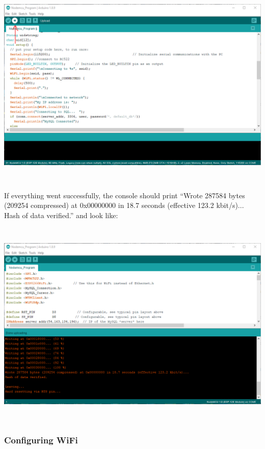 \documentclass[12pt]{article}
\begin{document}
\begin{spacing}{1.2}
\begin{center}
\includegraphics[height=10cm]{Arduino Program 4.PNG}
\end{center}

If everything went successfully, the console should print ``Wrote 287584 bytes (209254 compressed) at 0x00000000 in 18.7 seconds (effective 123.2 kbit/s)... \\
Hash of data verified.'' and look like:

\begin{center}
\includegraphics[height=10cm]{Arduino Program 5.PNG}
\end{center}

\subsubsection{Configuring WiFi}


\end{spacing}
\end{document}
